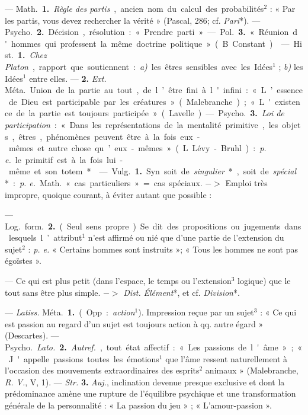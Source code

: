 \begin{itemize}[leftmargin=1cm, label=, itemsep=1pt]
 — \si{Math.} {\bf 1.} {\it Règle des partis}, ancien nom du calcul
des probabilités$^2$ : « Par les partis, vous devez rechercher la vérité
» (Pascal, 286; cf. {\it Pari}*). — \si{Psycho.} {\bf 2.} Décision,
résolution : « Prendre parti » — \si{Pol.} {\bf 3.} « Réunion d'hommes qui
professent la même doctrine politique » (B. Constant).

 — \si{Hist.} {\bf 1.} {\it Chez Platon}, rapport que
soutiennent : {\it a)} les êtres sensibles avec les Idées$^1$ ; {\it b)} les
Idées$^1$ entre elles. — {\bf 2.} {\it Ext.} \si{Méta.} Union de la partie au
tout, de l’être fini à l'infini : « L’essence de Dieu est participable par
les créatures » (Malebranche) ; « L'existence de la partie est toujours
participée » (Lavelle).

— \si{Psycho.} {\bf 3.} {\it Loi de participation} : « Dans les
représentations de la mentalité primitive, les objets, êtres, phénomènes
peuvent être à la fois eux-mêmes et autre chose qu’eux-mêmes » (L.
Lévy-Bruhl) : {\it p. e.} le primitif est à la fois lui-même et son totem*.

 — \si{Vulg.} {\bf 1.} Syn. soit de {\it singulier}*, soit de
{\it spécial}* : {\it p. e.} \si{Math.} « cas particuliers » = cas spéciaux.
$->$ Emploi très impropre, quoique courant, à éviter autant que possible :

— \si{Log.} \si{form.} {\bf 2.} (Seul sens propre). Se dit des propositions
ou jugements dans lesquels l’attribut$^1$ n'est affirmé ou nié que d’une
partie de l’extension du sujet$^2$ : {\it p. e.} « Certains hommes sont
instruits »; « Tous les hommes ne sont pas égoïstes ».

 — Ce qui est plus petit (dans l'espace, le temps ou
l'extension$^3$ logique) que le tout sans être plus simple. $->$ {\it Dist.}
{\it Élément}*, et cf. {\it Division}*.

 — {\it Latiss.} \si{Méta.} {\bf 1.} (Opp. : {\it action}$^1$).
Impression reçue par un sujet$^3$ : « Ce qui est passion au regard d’un sujet
est toujours action à qq. autre égard » (Descartes). — \si{Psycho.}
{\it Lato.} {\bf 2.} {\it Autref.}, tout état affectif : « Les passions de
l'âme » ; « J'appelle passions toutes les émotions$^1$ que l’âme ressent
naturellement à l’occasion des mouvements extraordinaires des esprits$^2$
animaux » (Malebranche, {\it R. V.}, V, 1). — {\it Str.} {\bf 3.} {\it Auj.},
inclination devenue presque exclusive et dont la prédominance amène une
rupture de l'équilibre psychique et une transformation générale de la
 personnalité : « La passion du jeu » ; « L'amour-passion ».


\end{itemize}
